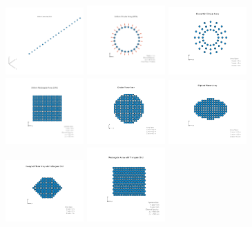 \documentclass{ctexbeamer}
\begin{document}
\begin{frame}
    \begin{figure}
        \includegraphics[width=3cm]{2-2.pdf}
        \includegraphics[width=3cm]{2-3.pdf}
        \includegraphics[width=3cm]{2-4.pdf}\\
        \includegraphics[width=3cm]{2-5.pdf}
        \includegraphics[width=3cm]{2-6.pdf}
        \includegraphics[width=3cm]{2-7.pdf}\\
        \includegraphics[width=3cm]{2-8.pdf}
        \includegraphics[width=3cm]{2-9.pdf}

\end{figure}
\end{frame}
\end{document}
